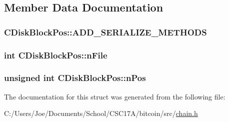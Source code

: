 \subsection{Member Data Documentation}
\hypertarget{struct_c_disk_block_pos_a958cd730b290bbb0153d514c56517590}{}
\subsubsection[{A\+D\+D\+\_\+\+S\+E\+R\+I\+A\+L\+I\+Z\+E\+\_\+\+M\+E\+T\+H\+O\+D\+S}]{\setlength{\rightskip}{0pt plus 5cm}C\+Disk\+Block\+Pos\+::\+A\+D\+D\+\_\+\+S\+E\+R\+I\+A\+L\+I\+Z\+E\+\_\+\+M\+E\+T\+H\+O\+D\+S}\label{struct_c_disk_block_pos_a958cd730b290bbb0153d514c56517590}
\hypertarget{struct_c_disk_block_pos_a09f30dab5c02fbdea8a17f9bcee5aac8}{}
\subsubsection[{n\+File}]{\setlength{\rightskip}{0pt plus 5cm}int C\+Disk\+Block\+Pos\+::n\+File}\label{struct_c_disk_block_pos_a09f30dab5c02fbdea8a17f9bcee5aac8}
\hypertarget{struct_c_disk_block_pos_a9b4b5e149b655ac5c22d05883b5bca0e}{}
\subsubsection[{n\+Pos}]{\setlength{\rightskip}{0pt plus 5cm}unsigned int C\+Disk\+Block\+Pos\+::n\+Pos}\label{struct_c_disk_block_pos_a9b4b5e149b655ac5c22d05883b5bca0e}


The documentation for this struct was generated from the following file\+:\begin{DoxyCompactItemize}
\item 
C\+:/\+Users/\+Joe/\+Documents/\+School/\+C\+S\+C17\+A/bitcoin/src/\hyperlink{chain_8h}{chain.\+h}\end{DoxyCompactItemize}
